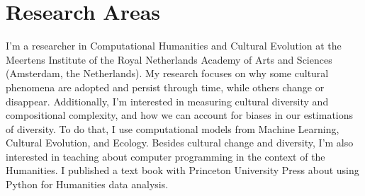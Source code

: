 \documentclass[12pt,letterpaper]{report}
\begin{document}
\section*{Research Areas}

I’m a researcher in Computational Humanities and Cultural Evolution at the Meertens
Institute of the Royal Netherlands Academy of Arts and Sciences (Amsterdam, the
Netherlands). My research focuses on why some cultural phenomena are adopted and persist
through time, while others change or disappear. Additionally, I’m interested in measuring
cultural diversity and compositional complexity, and how we can account for biases in our
estimations of diversity. To do that, I use computational models from Machine Learning,
Cultural Evolution, and Ecology. Besides cultural change and diversity, I’m also
interested in teaching about computer programming in the context of the Humanities. I
published a text book with Princeton University Press about using Python for Humanities
data analysis.

\nocite{*}
\printbibliography[title=Publications, heading=subbibliography]
\end{document}

